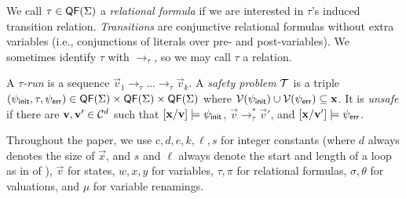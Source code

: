 We call $\tau \in \mathsf{QF}(\Sigma)$ a \emph{relational formula} if we are interested in $\tau$'s induced transition relation.
%
\emph{Transitions} are conjunctive relational formulas without extra variables (i.e., conjunctions of literals over pre- and post-variables).
%
We sometimes identify $\tau$ with $\to_\tau$, so we may call $\tau$ a relation.

A \emph{$\tau$-run} is a sequence $\vec{v}_1 \to_\tau \ldots \to_\tau \vec{v}_k$.
%
A \emph{safety problem} $\mathcal{T}$ is a triple $(\psi_{\mathsf{init}}, \tau,\psi_{\mathsf{err}}) \in \mathsf{QF}(\Sigma) \times \mathsf{QF}(\Sigma) \times \mathsf{QF}(\Sigma)$ where $\mathcal{V}(\psi_{\mathsf{init}}) \cup \mathcal{V}(\psi_{\mathsf{err}}) \subseteq \bm{\mathrm{x}}$.
%
 It is \emph{unsafe} if there\paper{ \vspace*{-.2cm}\pagebreak} are $\bm{\mathrm{v}},\bm{\mathrm{v}}' \in \mathcal{C}^d$ such that  $[\bm{\mathrm{x}} / \bm{\mathrm{v}}] \models \psi_{\mathsf{init}}$, $\vec{v} \to^*_\tau \vec{v}'$, and $[\bm{\mathrm{x}} / \bm{\mathrm{v}}'] \models \psi_{\mathsf{err}}$.

Throughout the paper, we use $c,d,e,k,\ell,s$ for integer constants (where $d$ always
denotes the size of $\vec{x}$, and $s$ and $\ell$ always denote the start and length of a
loop as in  of ), $\vec{v}$ for states, $w,x,y$ for
variables, $\tau,\pi$ for relational formulas, $\sigma,\theta$ for valuations, and $\mu$
for variable renamings.
 
